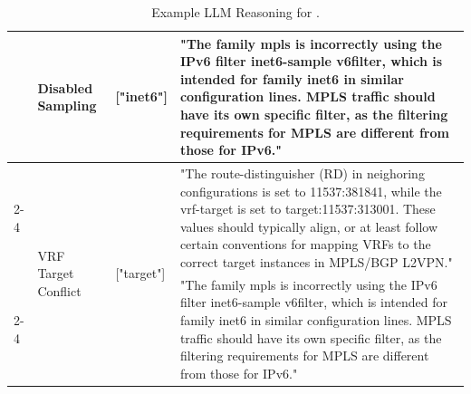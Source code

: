 \begin{table}[ht]
{\begin{tabular}{|l|l|l|p{8cm}|}
 & \multirow{5}{*}{Disabled Sampling} & \multirow{5}{*}{["inet6"]} & "The family mpls is incorrectly using the IPv6 filter inet6-sample v6filter, which is intended for family inet6 in similar configuration lines. MPLS traffic should have its own specific filter, as the filtering requirements for MPLS are different from those for IPv6."\\\cline{2-4}
 & \multirow{5}{*}{VRF Target Conflict} & \multirow{5}{*}{["target"]} & "The route-distinguisher (RD) in neighoring configurations is set to 11537:381841, while the vrf-target is set to target:11537:313001. These values should typically align, or at least follow certain conventions for mapping VRFs to the correct target instances in MPLS/BGP L2VPN."\\\cline{2-4}
 & \multirow{5}{*}{Incorrect Filter Usage} & \multirow{5}{*}{["input-list"]} & "The family mpls is incorrectly using the IPv6 filter inet6-sample v6filter, which is intended for family inet6 in similar configuration lines. MPLS traffic should have its own specific filter, as the filtering requirements for MPLS are different from those for IPv6."\\\hline
\end{tabular}}
\caption{Example LLM Reasoning for \sysname{}.}
\label{tab:syn_responses}
\end{table}





